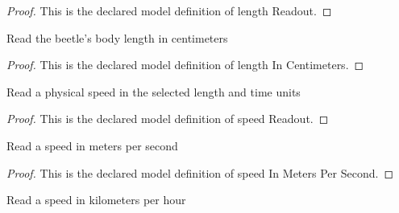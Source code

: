 \begin{proof}
  This is the declared model definition of length Readout.
\end{proof}
\begin{definition}
  \label{def:physics:phyx-mini-0332:phyxminiproblems-problemphyxmini0332-lengthincentimeters}
  Read the beetle's body length in centimeters
\end{definition}
\begin{proof}
  This is the declared model definition of length In Centimeters.
\end{proof}
\begin{definition}
  \label{def:physics:phyx-mini-0332:phyxminiproblems-problemphyxmini0332-speedreadout}
  Read a physical speed in the selected length and time units
\end{definition}
\begin{proof}
  This is the declared model definition of speed Readout.
\end{proof}
\begin{definition}
  \label{def:physics:phyx-mini-0332:phyxminiproblems-problemphyxmini0332-speedinmeterspersecond}
  Read a speed in meters per second
\end{definition}
\begin{proof}
  This is the declared model definition of speed In Meters Per Second.
\end{proof}
\begin{definition}
  \label{def:physics:phyx-mini-0332:phyxminiproblems-problemphyxmini0332-speedinkilometersperhour}
  Read a speed in kilometers per hour
\end{definition}
